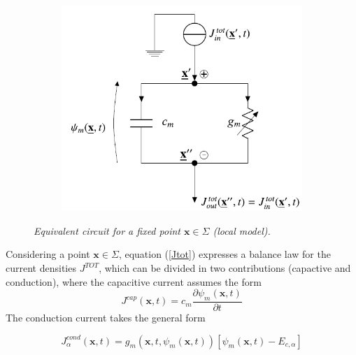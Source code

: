\documentclass[12pt, a4paper]{report}
\begin{document}
\begin{figure}[H]
	
		
	
			\begin{figure}[H]
				\centering
				\includegraphics[scale=0.6]{ode_circuit.png}
				
			\end{figure}
		
	\caption{\textit{Equivalent circuit for a fixed point $\textbf{x} \in \Sigma$ (local model).
		}} \label{circuit}
\end{figure}


Considering  a point $\textbf{x} \in \Sigma$, equation (\ref{Jtot}) expresses a balance law for the current densities $J^{TOT}$, which can be divided in two contributions (capactive and conduction), where the capacitive current assumes the form $$J^{cap}(\textbf{x},t) = c_m \frac{\partial \psi_m(\textbf{x},t)}{\partial t}$$
The conduction current takes the general form 

\begin{equation}
J^{cond}_{\alpha}(\textbf{x},t) = g_m(\textbf{x},t,\psi_m(\textbf{x},t)) [\psi_m(\textbf{x},t) - E_{c,\alpha}] \label{conduction current}
\end{equation}
\end{document}
